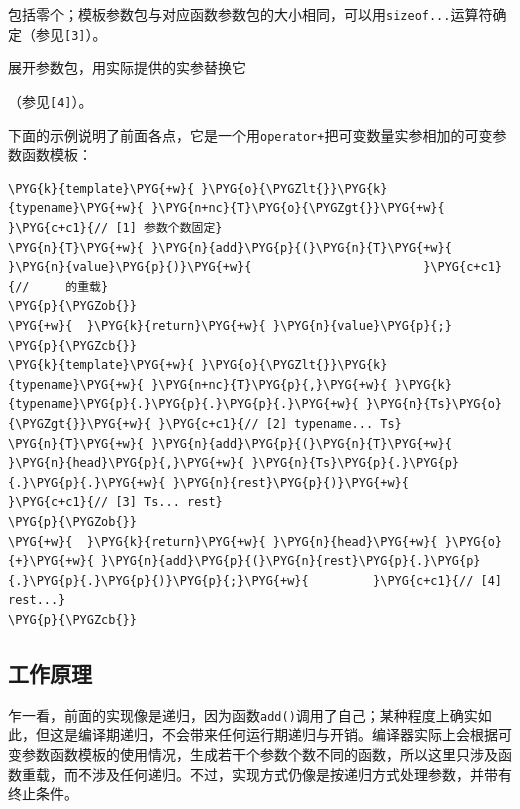
包括零个；模板参数包与对应函数参数包的大小相同，可以用\texttt{sizeof...}运算符确定（参见\texttt{[3]}）。



展开参数包，用实际提供的实参替换它



（参见\texttt{[4]}）。



下面的示例说明了前面各点，它是一个用\texttt{operator+}把可变数量实参相加的可变参数函数模板：



\begin{codeblockbg}
\begin{Verbatim}[commandchars=\\\{\},breaklines=true,breakanywhere=true,fontsize=\codefont,xleftmargin=17bp]
\PYG{k}{template}\PYG{+w}{ }\PYG{o}{\PYGZlt{}}\PYG{k}{typename}\PYG{+w}{ }\PYG{n+nc}{T}\PYG{o}{\PYGZgt{}}\PYG{+w}{                 }\PYG{c+c1}{// [1] 参数个数固定}
\PYG{n}{T}\PYG{+w}{ }\PYG{n}{add}\PYG{p}{(}\PYG{n}{T}\PYG{+w}{ }\PYG{n}{value}\PYG{p}{)}\PYG{+w}{                        }\PYG{c+c1}{//     的重载}
\PYG{p}{\PYGZob{}}
\PYG{+w}{  }\PYG{k}{return}\PYG{+w}{ }\PYG{n}{value}\PYG{p}{;}
\PYG{p}{\PYGZcb{}}
\PYG{k}{template}\PYG{+w}{ }\PYG{o}{\PYGZlt{}}\PYG{k}{typename}\PYG{+w}{ }\PYG{n+nc}{T}\PYG{p}{,}\PYG{+w}{ }\PYG{k}{typename}\PYG{p}{.}\PYG{p}{.}\PYG{p}{.}\PYG{+w}{ }\PYG{n}{Ts}\PYG{o}{\PYGZgt{}}\PYG{+w}{ }\PYG{c+c1}{// [2] typename... Ts}
\PYG{n}{T}\PYG{+w}{ }\PYG{n}{add}\PYG{p}{(}\PYG{n}{T}\PYG{+w}{ }\PYG{n}{head}\PYG{p}{,}\PYG{+w}{ }\PYG{n}{Ts}\PYG{p}{.}\PYG{p}{.}\PYG{p}{.}\PYG{+w}{ }\PYG{n}{rest}\PYG{p}{)}\PYG{+w}{             }\PYG{c+c1}{// [3] Ts... rest}
\PYG{p}{\PYGZob{}}
\PYG{+w}{  }\PYG{k}{return}\PYG{+w}{ }\PYG{n}{head}\PYG{+w}{ }\PYG{o}{+}\PYG{+w}{ }\PYG{n}{add}\PYG{p}{(}\PYG{n}{rest}\PYG{p}{.}\PYG{p}{.}\PYG{p}{.}\PYG{p}{)}\PYG{p}{;}\PYG{+w}{         }\PYG{c+c1}{// [4] rest...}
\PYG{p}{\PYGZcb{}}
\end{Verbatim}
\end{codeblockbg}



\subsection{工作原理}



乍一看，前面的实现像是递归，因为函数\texttt{add()}调用了自己；某种程度上确实如此，但这是编译期递归，不会带来任何运行期递归与开销。编译器实际上会根据可变参数函数模板的使用情况，生成若干个参数个数不同的函数，所以这里只涉及函数重载，而不涉及任何递归。不过，实现方式仍像是按递归方式处理参数，并带有终止条件。


